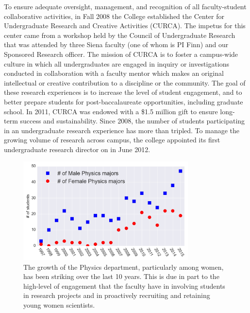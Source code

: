 \documentclass[11pt, preprint]{aastex}
\begin{document}

				

To ensure adequate oversight, management, and recognition of all faculty-student
collaborative activities, in Fall 2008 the College established the Center for
Undergraduate Research and Creative Activities (CURCA).  The impetus
for this center came from a workshop held by the Council of
Undergraduate Research that was attended by three Siena faculty (one of whom is PI Finn)
and our Sponsored Research officer.  The mission of CURCA is
to foster a campus-wide culture in which all undergraduates are engaged in
inquiry or investigations conducted in collaboration with a faculty mentor which
makes an original intellectual or creative contribution to a discipline or the
community.  The goal of these research experiences is to increase the level of
student engagement, and to better prepare students for post-baccalaureate
opportunities, including graduate school. In 2011, CURCA was endowed with a
\$1.5 million gift to ensure long-term success and sustainability. Since 2008,
the number of students participating in an undergraduate research experience has
more than tripled. To manage the growing volume of research across
campus, the college appointed its first undergraduate research director
on in June 2012.



\begin{figure}[h]
\centering
\includegraphics[width=0.8\textwidth]{dept_plot.png}
\caption{The growth of the Physics department, particularly among women, has
  been striking over the last 10 years.  This is due in part to the high-level
  of engagement that the faculty have in involving students in research projects
  and in proactively recruiting and retaining young women scientists.
\label{fig:dept}}
\end{figure}
\end{document}
